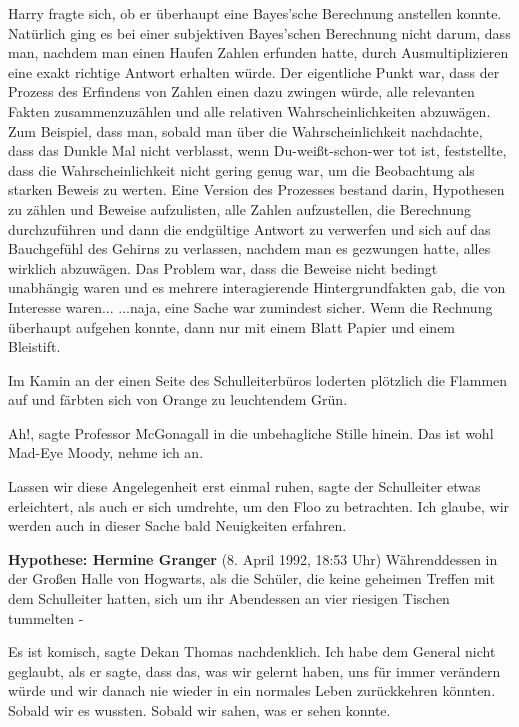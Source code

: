 Harry fragte sich, ob er überhaupt eine Bayes'sche Berechnung anstellen konnte.
Natürlich ging es bei einer subjektiven Bayes'schen Berechnung nicht darum, dass
man, nachdem man einen Haufen Zahlen erfunden hatte, durch Ausmultiplizieren
eine exakt richtige Antwort erhalten würde. Der eigentliche Punkt war, dass der
Prozess des Erfindens von Zahlen einen dazu zwingen würde, alle relevanten
Fakten zusammenzuzählen und alle relativen Wahrscheinlichkeiten abzuwägen. Zum
Beispiel, dass man, sobald man über die Wahrscheinlichkeit nachdachte, dass das
Dunkle Mal nicht verblasst, wenn Du-weißt-schon-wer tot ist, feststellte, dass
die Wahrscheinlichkeit nicht gering genug war, um die Beobachtung als starken
Beweis zu werten. Eine Version des Prozesses bestand darin, Hypothesen zu zählen
und Beweise aufzulisten, alle Zahlen aufzustellen, die Berechnung durchzuführen
und dann die endgültige Antwort zu verwerfen und sich auf das Bauchgefühl des
Gehirns zu verlassen, nachdem man es gezwungen hatte, alles wirklich abzuwägen.
Das Problem war, dass die Beweise nicht bedingt unabhängig waren und es mehrere
interagierende Hintergrundfakten gab, die von Interesse waren... ...naja, eine
Sache war zumindest sicher. Wenn die Rechnung überhaupt aufgehen konnte, dann
nur mit einem Blatt Papier und einem Bleistift.

Im Kamin an der einen Seite des Schulleiterbüros loderten plötzlich die Flammen
auf und färbten sich von Orange zu leuchtendem Grün.

\glqq{}Ah!\grqq{}, sagte Professor McGonagall in die unbehagliche Stille hinein.
\glqq{}Das ist wohl Mad-Eye Moody, nehme ich an.\grqq{}

\glqq{}Lassen wir diese Angelegenheit erst einmal ruhen\grqq{}, sagte der
Schulleiter etwas erleichtert, als auch er sich umdrehte, um den Floo zu
betrachten. \glqq{}Ich glaube, wir werden auch in dieser Sache bald Neuigkeiten
erfahren.\grqq{}

\textbf{Hypothese: Hermine Granger} (8. April 1992, 18:53 Uhr) Währenddessen in
der Großen Halle von Hogwarts, als die Schüler, die keine geheimen Treffen mit
dem Schulleiter hatten, sich um ihr Abendessen an vier riesigen Tischen
tummelten -

\glqq{}Es ist komisch\grqq{}, sagte Dekan Thomas nachdenklich. \glqq{}Ich habe dem
General nicht geglaubt, als er sagte, dass das, was wir gelernt haben, uns für
immer verändern würde und wir danach nie wieder in ein normales Leben
zurückkehren könnten. Sobald wir es wussten. Sobald wir sahen, was er sehen
konnte.\grqq{}

